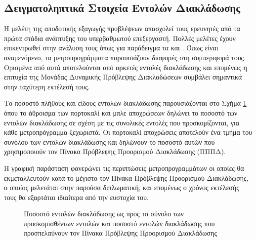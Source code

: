 
\subsection{Δειγματοληπτικά Στοιχεία Εντολών Διακλάδωσης}

Η μελέτη της αποδοτικής εξαγωγής προβλέψεων απασχολεί τους ερευνητές από τα πρώτα στάδια ανάπτυξης του υπερβαθμωτού επεξεργαστή. Πολλές μελέτες έχουν επικεντρωθεί στην ανάλυση τους όπως για παράδειγμα τα \cite{Lee2003ExploitingCT} και \cite{eyerman2006characterizing}. Όπως είναι αναμενόμενο, τα μετροπρογράμματα παρουσιάζουν διαφορές στη συμπεριφορά τους. Ορισμένα από αυτά αποτελούνται από αρκετές εντολές διακλάδωσης και επομένως η επιτυχία της Μονάδας Δυναμικής Πρόβλεψης Διακλαδώσεων συμβάλει σημαντικά στην ταχύτερη εκτέλεσή τους.
\par
Το ποσοστό πλήθους και είδους εντολών διακλάδωσης παρουσιάζονται στο Σχήμα \ref{fig:chap2_branch_instr_stats} όπου το άθροισμα των πορτοκαλί και μπλε αποχρώσεων δηλώνει το ποσοστό των εντολών διακλάδωσης σε σχέση με τις συνολικές εντολές που προσκομίζονται, για κάθε μετροπρόγραμμα \spec ξεχωριστά. Οι πορτοκαλί αποχρώσεις αποτελούν ένα τμήμα του συνόλου των εντολών διακλάδωσης και δηλώνουν το ποσοστό αυτών που χρησιμοποιούν τον Πίνακα Πρόβλεψης Προορισμού Διακλάδωσης (ΠΠΠΔ).
\par
Η γραφική παράσταση φανερώνει τις περιπτώσεις μετροπρογραμμάτων οι οποίες θα εκμεταλλευτούν κατά το μέγιστο τον Πίνακα Πρόβλεψης Προορισμού Διακλάδωσης, ο οποίος μελετάται στην παρούσα διπλωματική, και επομένως ο χρόνος εκτέλεσής τους θα εξαρτάται ιδιαίτερα από την ευστοχία του.

\begin{figure}[!h]
    \centering
    \caption{Ποσοστό εντολών διακλάδωσης ως προς το σύνολο των προσκομισθέντων εντολών και ποσοστό εντολών διακλάδωσης που προσπελαύνουν τον Πίνακα Πρόβλεψης Προορισμού Διακλάδωσης}
    \label{fig:chap2_branch_instr_stats}
\end{figure}

